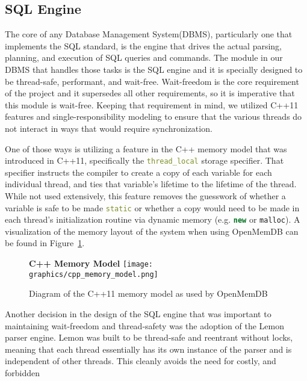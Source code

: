 \documentclass[letterpaper, 12pt]{article}
\newcommand{\inlinecode}[1]{\colorbox{codegrey}{\lstinline[language=C++]{#1}}}
\begin{document}
  \subsection{SQL Engine}
  The core of any Database Management System(DBMS), particularly one that implements the SQL standard, is the
  engine that drives the actual parsing, planning, and execution of SQL queries and commands.
  The module in our DBMS that handles those tasks is the SQL engine and it is specially designed to
  be thread-safe, performant, and wait-free. Wait-freedom is the core requirement of the project
  and it supersedes all other requirements, so it is imperative that this module is wait-free. Keeping
  that requirement in mind, we utilized C++11 features and single-responsibility modeling to
  ensure that the various threads do not interact in ways that would require synchronization.
  \par\vspace{\baselineskip}
  One of those ways is utilizing a feature in the C++ memory model that was introduced in C++11, specifically
  the \inlinecode{thread_local} storage specifier. That specifier instructs the compiler
  to create a copy of each variable for each individual thread, and ties that variable's lifetime
  to the lifetime of the thread. While not used extensively, this feature removes the guesswork
  of whether a variable is safe to be made \inlinecode{static} or whether a copy
  would need to be made in each thread's initialization routine via dynamic memory (e.g.
  \inlinecode{new} or \inlinecode{malloc}). A visualization of the memory layout of the system
  when using OpenMemDB can be found in Figure~\ref{fig:cpp_mem_model}.
  \par\vspace{\baselineskip}
  \begin{figure}
   \centering
    \textbf{C++ Memory Model}
    \texttt{[image: graphics/cpp\_memory\_model.png]}
    \caption{Diagram of the C++11 memory model as used by OpenMemDB}
    \label{fig:cpp_mem_model}
  \end{figure}
  \par\vspace{\baselineskip}
  Another decision in the design of the SQL engine that was important to maintaining wait-freedom and
  thread-safety was the adoption of the Lemon parser engine. Lemon was built to be thread-safe and
  reentrant without locks, meaning that each thread essentially has its own instance of the parser
  and is independent of other threads. This cleanly avoids the need for costly, and forbidden
\end{document}
